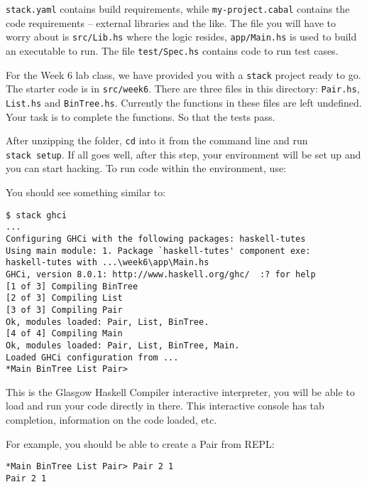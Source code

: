 \documentclass[12pt,]{tufte-handout}
\newenvironment{Shaded}{}{}
\newcommand{\ExtensionTok}[1]{{#1}}
\newcommand{\NormalTok}[1]{{#1}}
\begin{document}
\texttt{stack.yaml} contains build requirements, while
\texttt{my-project.cabal} contains the code requirements -- external
libraries and the like. The file you will have to worry about is
\texttt{src/Lib.hs} where the logic resides, \texttt{app/Main.hs} is
used to build an executable to run. The file \texttt{test/Spec.hs}
contains code to run test cases.

For the Week 6 lab class, we have provided you with a \texttt{stack}
project ready to go. The starter code is in \texttt{src/week6}. There
are three files in this directory: \texttt{Pair.hs}, \texttt{List.hs}
and \texttt{BinTree.hs}. Currently the functions in these files are left
undefined. Your task is to complete the functions. So that the tests
pass.

After unzipping the folder, \texttt{cd} into it from the command line
and run \texttt{stack\ setup}. If all goes well, after this step, your
environment will be set up and you can start hacking. To run code within
the environment, use:

\begin{Shaded}
\end{Shaded}

You should see something similar to:

\begin{verbatim}
$ stack ghci
...
Configuring GHCi with the following packages: haskell-tutes
Using main module: 1. Package `haskell-tutes' component exe:
haskell-tutes with ...\week6\app\Main.hs
GHCi, version 8.0.1: http://www.haskell.org/ghc/  :? for help
[1 of 3] Compiling BinTree  
[2 of 3] Compiling List   
[3 of 3] Compiling Pair  
Ok, modules loaded: Pair, List, BinTree.
[4 of 4] Compiling Main    
Ok, modules loaded: Pair, List, BinTree, Main.
Loaded GHCi configuration from ...
*Main BinTree List Pair>
\end{verbatim}

This is the Glasgow Haskell Compiler interactive interpreter, you will
be able to load and run your code directly in there. This interactive
console has tab completion, information on the code loaded, etc.

For example, you should be able to create a Pair from REPL:

\begin{verbatim}
*Main BinTree List Pair> Pair 2 1
Pair 2 1
\end{verbatim}
\end{document}
